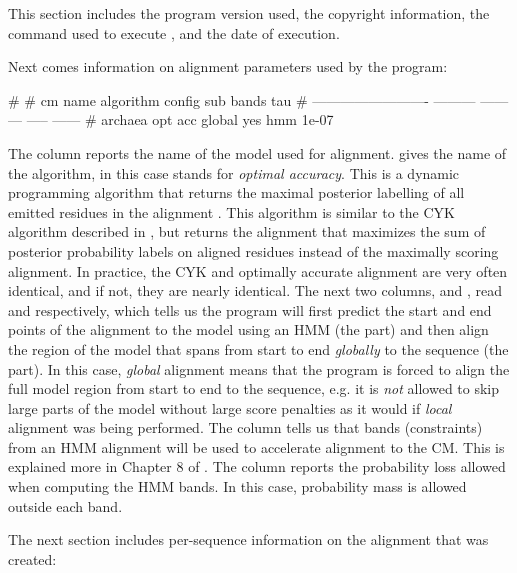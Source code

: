 This section includes the program version used, the copyright
information, the command used to execute , and the date
of execution.

Next comes information on alignment parameters used by the program:

\begin{sreoutput}
#
# cm name                    algorithm  config  sub  bands     tau
# -------------------------  ---------  ------  ---  -----  ------
# archaea                      opt acc  global  yes    hmm   1e-07
\end{sreoutput}

The  column reports the name of the model used for
alignment.  gives the name of the algorithm, in this
case  stands for \emph{optimal accuracy}. This is a
dynamic programming algorithm that returns the maximal posterior
labelling of all emitted residues in the alignment \cite{Holmes98}.
This algorithm is similar to the CYK algorithm described in
\cite{Nawrocki09b}, but returns the alignment that maximizes the sum
of posterior probability labels on aligned residues instead of the
maximally scoring alignment. In practice, the CYK and optimally
accurate alignment are very often identical, and if not, they are
nearly identical.  The next two columns,  and ,
read  and  respectively, which tells us the
program will first predict the start and end points of the alignment
to the model using an HMM (the  part) and then align the
region of the model that spans from start to end \emph{globally} to
the sequence (the  part). In this case, \emph{global}
alignment means that the program is forced to align the full model
region from start to end to the sequence, e.g. it is \emph{not}
allowed to skip large parts of the model without large score penalties
as it would if \emph{local} alignment was being performed. The
 column tells us that bands (constraints) from an HMM
alignment will be used to accelerate alignment to the CM. This is
explained more in Chapter 8 of \cite{Nawrocki09b}. The  column
reports the probability loss allowed when computing the HMM bands. In
this case,  probability mass is allowed outside each
band. 

The next section includes per-sequence information on the alignment
that was created:

